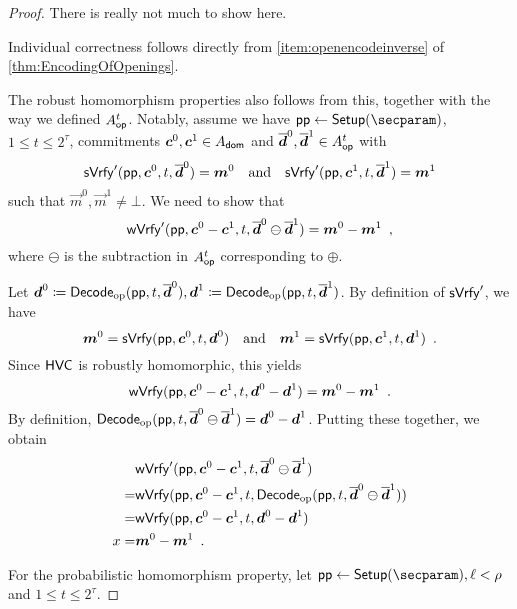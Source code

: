 \begin{proof}
There is really not much to show here.

Individual correctness follows directly from \autoref{item:openencodeinverse} of \autoref{thm:EncodingOfOpenings}.

The robust homomorphism properties also follows from this, together with the way we defined $A_{\mathsf{op}}^{t}$.
Notably, assume we have $\params\gets\setup(\secparam)$, $1\leq t \leq 2^\tau$, commitments $\boldsymbol{c}^0,\boldsymbol{c}^1\in A_{\mathsf{dom}}$ and $\overline{\boldsymbol{d}}^0,\overline{\boldsymbol{d}}^1\in A_{\mathsf{op}}^{t}$ with
\[
 \mathsf{sVrfy}'(\mathsf{pp},\boldsymbol{c}^0,t,\overline{\boldsymbol{d}}^0) = \boldsymbol{m}^0
 \quad\text{and}\quad
 \mathsf{sVrfy}'(\mathsf{pp},\boldsymbol{c}^1,t,\overline{\boldsymbol{d}}^1) = \boldsymbol{m}^1
\]
such that $\vec{m}^0,\vec{m}^1\neq \bot$.
We need to show that
\[
 \mathsf{wVrfy}'(\mathsf{pp}, \boldsymbol{c}^0-\boldsymbol{c}^1, t, \overline{\boldsymbol{d}}^0 \ominus \overline{\boldsymbol{d}}^1) = \boldsymbol{m}^0 - \boldsymbol{m}^1\enspace,
\]
where $\ominus$ is the subtraction in $A_{\mathsf{op}}^{t}$ corresponding to $\oplus$.

Let $\boldsymbol{d}^0 \coloneqq \mathsf{Decode}_{\mathrm{op}}(\mathsf{pp}, t, \overline{\boldsymbol{d}}^0), \boldsymbol{d}^1\coloneqq \mathsf{Decode}_{\mathrm{op}}(\mathsf{pp}, t, \overline{\boldsymbol{d}}^1)$. By definition of $\mathsf{sVrfy}'$, we have
\[
 \boldsymbol{m}^0 = \mathsf{sVrfy}(\mathsf{pp},\boldsymbol{c}^0,t,\boldsymbol{d}^0)
 \quad\text{and}\quad
 \boldsymbol{m}^1 = \mathsf{sVrfy}(\mathsf{pp},\boldsymbol{c}^1,t,\boldsymbol{d}^1)\enspace.
\]
Since $\mathsf{HVC}$ is robustly homomorphic, this yields
\[
 \mathsf{wVrfy}(\mathsf{pp}, \boldsymbol{c}^0-\boldsymbol{c}^1, t, \boldsymbol{d}^0 - \boldsymbol{d}^1) = \boldsymbol{m}^0 - \boldsymbol{m}^1\enspace.
\]
By definition, $\mathsf{Decode}_{\mathrm{op}}(\mathsf{pp}, t, \overline{\boldsymbol{d}}^0 \ominus \overline{\boldsymbol{d}}^1) = \boldsymbol{d}^0 - \boldsymbol{d}^1$. Putting these together, we obtain
\begin{align*}
   &\mathsf{wVrfy}'(\mathsf{pp}, \boldsymbol{c}^0-\boldsymbol{c}^1, t, \overline{\boldsymbol{d}}^0 \ominus \overline{\boldsymbol{d}}^1) \\
 = &\mathsf{wVrfy} (\mathsf{pp}, \boldsymbol{c}^0 - \boldsymbol{c}^1, t, \mathsf{Decode}_{\mathrm{op}}(\mathsf{pp}, t, \overline{\boldsymbol{d}}^0 \ominus \overline{\boldsymbol{d}}^1) )\\
 = &\mathsf{wVrfy} (\mathsf{pp}, \boldsymbol{c}^0 - \boldsymbol{c}^1, t, \boldsymbol{d}^0 - \boldsymbol{d}^1)\\x
 = &\boldsymbol{m}^0 - \boldsymbol{m}^1\enspace.
\end{align*}

For the probabilistic homomorphism property, let $\params\gets\setup(\secparam), \ell < \rho$ and $1\leq t \leq 2^\tau$.


\end{proof}
